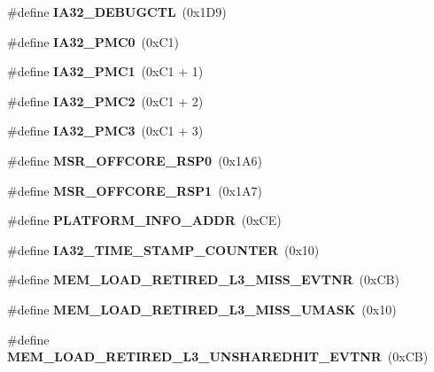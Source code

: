 \begin{DoxyCompactItemize}
\item 
\#define {\bfseries I\+A32\+\_\+\+D\+E\+B\+U\+G\+C\+TL}~(0x1\+D9)\label{types_8h_a6e3807d506c237c1e48f8a1c86568711}

\item 
\#define {\bfseries I\+A32\+\_\+\+P\+M\+C0}~(0x\+C1)\label{types_8h_a4554738d7da6a73d954483b208f81db3}

\item 
\#define {\bfseries I\+A32\+\_\+\+P\+M\+C1}~(0x\+C1 + 1)\label{types_8h_a8fa283364a2d1104f70d904270883cb2}

\item 
\#define {\bfseries I\+A32\+\_\+\+P\+M\+C2}~(0x\+C1 + 2)\label{types_8h_afe3565c403a07374f8d610cdf541baee}

\item 
\#define {\bfseries I\+A32\+\_\+\+P\+M\+C3}~(0x\+C1 + 3)\label{types_8h_a5566a7b0fe387bce0c26c686b10461d2}

\item 
\#define {\bfseries M\+S\+R\+\_\+\+O\+F\+F\+C\+O\+R\+E\+\_\+\+R\+S\+P0}~(0x1\+A6)\label{types_8h_a215d0676fd6bdc55c65ea6116919da53}

\item 
\#define {\bfseries M\+S\+R\+\_\+\+O\+F\+F\+C\+O\+R\+E\+\_\+\+R\+S\+P1}~(0x1\+A7)\label{types_8h_a78dc77e6b5f300a28990557043f946e2}

\item 
\#define {\bfseries P\+L\+A\+T\+F\+O\+R\+M\+\_\+\+I\+N\+F\+O\+\_\+\+A\+D\+DR}~(0x\+C\+E)\label{types_8h_a36cfb7e155c237aea26a1a61a08531b4}

\item 
\#define {\bfseries I\+A32\+\_\+\+T\+I\+M\+E\+\_\+\+S\+T\+A\+M\+P\+\_\+\+C\+O\+U\+N\+T\+ER}~(0x10)\label{types_8h_a2f40dbbbfee7082937c1387cf2c34d64}

\item 
\#define {\bfseries M\+E\+M\+\_\+\+L\+O\+A\+D\+\_\+\+R\+E\+T\+I\+R\+E\+D\+\_\+\+L3\+\_\+\+M\+I\+S\+S\+\_\+\+E\+V\+T\+NR}~(0x\+C\+B)\label{types_8h_a11151e507895f0b9fbf12448944361d1}

\item 
\#define {\bfseries M\+E\+M\+\_\+\+L\+O\+A\+D\+\_\+\+R\+E\+T\+I\+R\+E\+D\+\_\+\+L3\+\_\+\+M\+I\+S\+S\+\_\+\+U\+M\+A\+SK}~(0x10)\label{types_8h_a97de88538de409f371031bd4070e8359}

\item 
\#define {\bfseries M\+E\+M\+\_\+\+L\+O\+A\+D\+\_\+\+R\+E\+T\+I\+R\+E\+D\+\_\+\+L3\+\_\+\+U\+N\+S\+H\+A\+R\+E\+D\+H\+I\+T\+\_\+\+E\+V\+T\+NR}~(0x\+C\+B)\label{types_8h_ac3057c525d05ff1ff3bbc866a6959ef0}


\end{DoxyCompactItemize}
